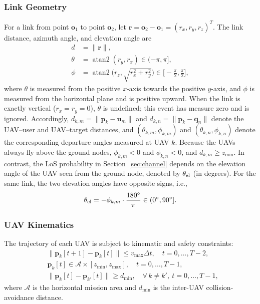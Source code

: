 \documentclass[conference]{IEEEtran}
\begin{document}
\subsubsection{Link Geometry}
For a link from point $\mathbf o_1$ to point $\mathbf o_2$, let $\mathbf r=\mathbf o_2-\mathbf o_1=(r_x,r_y,r_z)^T$. The link distance, azimuth angle, and elevation angle are
\begin{align}
d&=\|\mathbf r\|,\\
\theta&=\operatorname{atan2}(r_y,r_x)\in(-\pi,\pi],\\
\phi&=\operatorname{atan2}\!\Big(r_z,\sqrt{r_x^2+r_y^2}\Big)\in\Big[-\tfrac{\pi}{2},\tfrac{\pi}{2}\Big],
\end{align}
where $\theta$ is measured from the positive $x$-axis towards the positive $y$-axis, and $\phi$ is measured from the horizontal plane and is positive upward. When the link is exactly vertical ($r_x=r_y=0$), $\theta$ is undefined; this event has measure zero and is ignored. Accordingly, $d_{k,m}=\|\mathbf p_k-\mathbf u_m\|$ and $d_{k,n}=\|\mathbf p_k-\mathbf q_n\|$ denote the UAV--user and UAV--target distances, and $(\theta_{k,m},\phi_{k,m})$ and $(\theta_{k,n},\phi_{k,n})$ denote the corresponding departure angles measured at UAV $k$. Because the UAVs always fly above the ground nodes, $\phi_{k,m}<0$ and $\phi_{k,n}<0$, and $d_{k,m}\ge z_{\min}$. In contrast, the LoS probability in Section~\ref{sec:channel} depends on the elevation angle of the UAV seen from the ground node, denoted by $\theta_{\rm el}$ (in degrees). For the same link, the two elevation angles have opposite signs, i.e.,
\begin{equation}
\theta_{\rm el}=-\phi_{k,m}\cdot\frac{180^\circ}{\pi}\in(0^\circ,90^\circ].
\end{equation}

\subsubsection{UAV Kinematics}
The trajectory of each UAV is subject to kinematic and safety constraints:
\begin{align}
&\|\mathbf p_k[t+1]-\mathbf p_k[t]\|\le v_{\max}\Delta t,\quad t=0,\ldots,T-2,\\
&\mathbf p_k[t]\in\mathcal A\times[z_{\min},z_{\max}],\quad t=0,\ldots,T-1,\\
&\|\mathbf p_k[t]-\mathbf p_{k'}[t]\|\ge d_{\min},\quad\forall\,k\neq k',\ t=0,\ldots,T-1,
\end{align}
where $\mathcal A$ is the horizontal mission area and $d_{\min}$ is the inter-UAV collision-avoidance distance.
\end{document}
